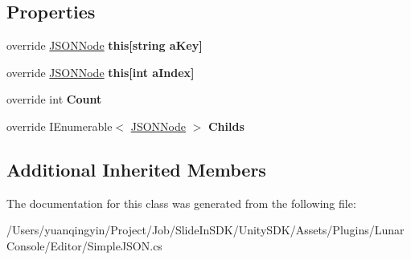 \subsection*{Properties}
\begin{DoxyCompactItemize}
\item 
\mbox{\label{class_lunar_console_editor_internal_1_1_j_s_o_n_class_a4dfcf811f1f130669ddb1ee7caac6531}} 
override \mbox{\hyperlink{class_lunar_console_editor_internal_1_1_j_s_o_n_node}{J\+S\+O\+N\+Node}} {\bfseries this\mbox{[}string a\+Key\mbox{]}}
\item 
\mbox{\label{class_lunar_console_editor_internal_1_1_j_s_o_n_class_a523a687bd12629b093225d7716e8fd98}} 
override \mbox{\hyperlink{class_lunar_console_editor_internal_1_1_j_s_o_n_node}{J\+S\+O\+N\+Node}} {\bfseries this\mbox{[}int a\+Index\mbox{]}}
\item 
\mbox{\label{class_lunar_console_editor_internal_1_1_j_s_o_n_class_aaa2e89239bab1bee76ab03c1df550c3b}} 
override int {\bfseries Count}
\item 
\mbox{\label{class_lunar_console_editor_internal_1_1_j_s_o_n_class_a64a69ed78985d4774a67b4d739305e0d}} 
override I\+Enumerable$<$ \mbox{\hyperlink{class_lunar_console_editor_internal_1_1_j_s_o_n_node}{J\+S\+O\+N\+Node}} $>$ {\bfseries Childs}
\end{DoxyCompactItemize}
\subsection*{Additional Inherited Members}


The documentation for this class was generated from the following file\+:\begin{DoxyCompactItemize}
\item 
/\+Users/yuanqingyin/\+Project/\+Job/\+Slide\+In\+S\+D\+K/\+Unity\+S\+D\+K/\+Assets/\+Plugins/\+Lunar\+Console/\+Editor/Simple\+J\+S\+O\+N.\+cs\end{DoxyCompactItemize}
